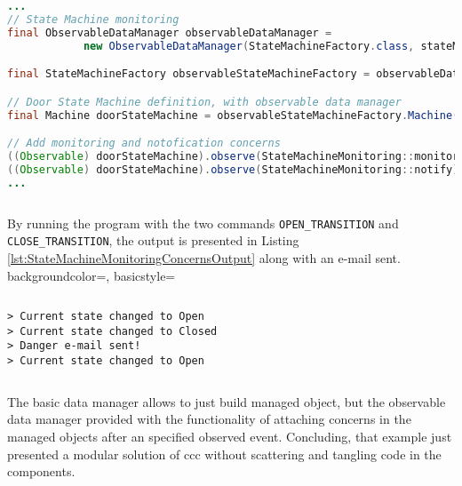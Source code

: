 \begin{sourcecode} [H]
	\begin{lstlisting}[language=Java, escapechar=|]
...
// State Machine monitoring
final ObservableDataManager observableDataManager = 
			new ObservableDataManager(StateMachineFactory.class, stateMachineSchema);

final StateMachineFactory observableStateMachineFactory = observableDataManager.make();

// Door State Machine definition, with observable data manager
final Machine doorStateMachine = observableStateMachineFactory.Machine();

// Add monitoring and notofication concerns
((Observable) doorStateMachine).observe(StateMachineMonitoring::monitor); |\label{line:state_machine_monitor}|
((Observable) doorStateMachine).observe(StateMachineMonitoring::notify);  |\label{line:state_machine_notify}|
...
	\end{lstlisting}
	\caption{Door state machine with concerns}
	\label{lst:StateMachineMonitoringConcerns}
\end{sourcecode}

By running the program with the two commands \texttt{OPEN\_TRANSITION} and \texttt{CLOSE\_TRANSITION}, the output is presented in Listing \ref{lst:StateMachineMonitoringConcernsOutput} along with an e-mail sent.
 {
    backgroundcolor=\color{white},
    basicstyle=\scriptsize\color{black}\ttfamily
}

\begin{sourcecode} [H]
	\lstset{numbers=none}
	\begin{lstlisting}[style=Bash]
> Current state changed to Open
> Current state changed to Closed
> Danger e-mail sent!
> Current state changed to Open
	\end{lstlisting}
	\caption{Door state machine with concerns: output}
	\label{lst:StateMachineMonitoringConcernsOutput}
\end{sourcecode}

The basic data manager allows to just build managed object, but the observable data manager provided with the functionality of attaching concerns in the managed objects after an specified observed event.
Concluding, that example just presented a modular solution of \ac{ccc} without scattering and tangling code in the components.
